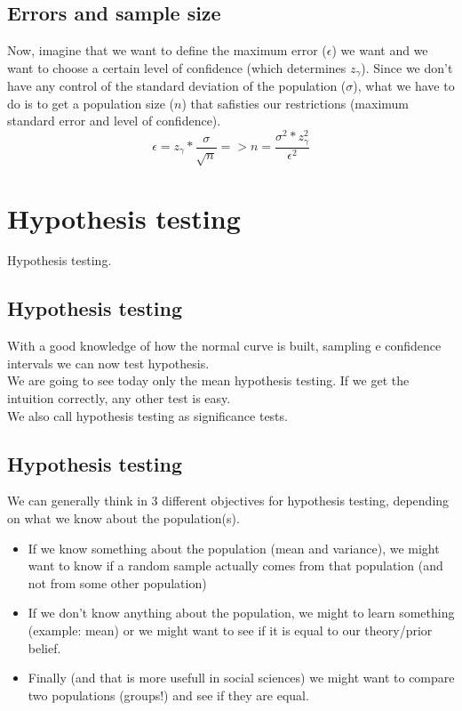 \documentclass[11pt]{article}
\begin{document}
	\subsection*{Errors and sample size}
Now, imagine that we want to define the maximum error ($\epsilon$) we want and we want to choose a certain level of confidence (which determines $z_\gamma$). Since we don't have any control of the standard deviation of the population ($\sigma$), what we have to do is to get a population size ($n$) that safisties our restrictions (maximum standard error and level of confidence).
	\[\epsilon=z_\gamma*\frac{\sigma}{\sqrt{n}} => n=\frac{\sigma^2*z_\gamma^2}{\epsilon^2}\]	

\section{Hypothesis testing}

Hypothesis testing.

	\subsection*{Hypothesis testing}
	With a good knowledge of how the normal curve is built, sampling e confidence intervals we can now test hypothesis.
	\newline\\
	We are going to see today only the mean hypothesis testing. If we get the intuition correctly, any other test is easy.
	\newline\\
	We also call hypothesis testing as significance tests.

	\subsection*{Hypothesis testing}
	We can generally think in 3 different objectives for hypothesis testing, depending on what we know about the population(s).
	\begin{itemize}
		\item If we know something about the population (mean and variance), we might want to know if a random sample actually comes from that population (and not from some other population)
		\item If we don't know anything about the population, we might to learn something (example: mean) or we might want to see if it is equal to our theory/prior belief.
		\item Finally (and that is more usefull in social sciences) we might want to compare two populations (groups!) and see if they are equal.
	\end{itemize}
\end{document}
